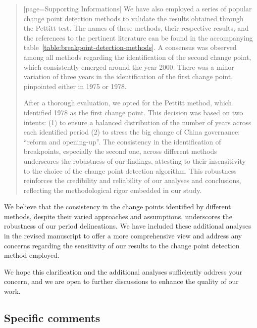 \begin{quote}[page=Supporting Informations]
	We have also employed a series of popular change point detection methods to validate the results obtained through the Pettitt test. The names of these methods, their respective results, and the references to the pertinent literature can be found in the accompanying table~\ref{table:breakpoint-detection-methods}. A consensus was observed among all methods regarding the identification of the second change point, which consistently emerged around the year 2000. There was a minor variation of three years in the identification of the first change point, pinpointed either in 1975 or 1978.

	After a thorough evaluation, we opted for the Pettitt method, which identified 1978 as the first change point. This decision was based on two intents: (1) to ensure a balanced distribution of the number of years across each identified period (2) to stress the big change of China governance: ``reform and opening-up''. The consistency in the identification of breakpoints, especially the second one, across different methods underscores the robustness of our findings, attesting to their insensitivity to the choice of the change point detection algorithm. This robustness reinforces the credibility and reliability of our analyses and conclusions, reflecting the methodological rigor embedded in our study.
\end{quote}

\AR*{} We believe that the consistency in the change points identified by different methods, despite their varied approaches and assumptions, underscores the robustness of our period delineations. We have included these additional analyses in the revised manuscript to offer a more comprehensive view and address any concerns regarding the sensitivity of our results to the change point detection method employed.

\AR*{} We hope this clarification and the additional analyses sufficiently address your concern, and we are open to further discussions to enhance the quality of our work.

\subsection*{Specific comments}

